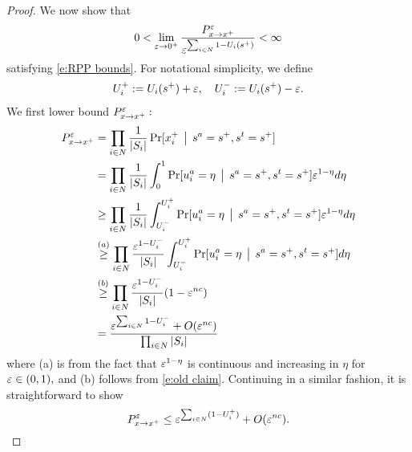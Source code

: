 \begin{proof}
We now show that
\begin{equation}
0 < \lim_{\varepsilon\to 0^+} \frac{P^\varepsilon_{x\to x^+}}{\varepsilon^{\sum_{i\in N}1 - U_i(s^+)}}<\infty
\end{equation}
satisfying \eqref{e:RPP bounds}. For notational simplicity, we define 
\begin{align}
U_i^+	:= U_i(s^+)+\varepsilon,\quad U_i^-	:=U_i(s^+) - \varepsilon.\label{e:u defns}
\end{align}
We first lower bound $P^\varepsilon_{x\to x^+} :$
\small
{\allowdisplaybreaks[3]\begin{align}
P^\eps_{x\to x^+}	&= \prod_{i\in N}{1\over|S_i|}\Pr[x_i^+ \given s^a = s^+, s^t =s^+]\nonumber\\
			&= \prod_{i\in N}{1\over |S_i|}\int_0^1 \Pr[u_i^a = \eta \given s^a = s^+, s^t = s^+]\eps^{1-\eta}d\eta\nonumber\\
			&\geq \prod_{i\in N}{1\over |S_i|}\int_{U_i^-}^{U_i^+}\Pr[u_i^a = \eta\given s^a = s^+, s^t = s^+ ]\eps^{1-\eta}d\eta\nonumber\\
			&\stackrel{(a)}{\geq}\prod_{i\in N}{\eps^{1 - U_i^-}\over |S_i|}\int_{U_i^-}^{U_i^+} \Pr[u_i^a = \eta\given  s^a = s^+, s^t = s^+] d\eta\nonumber\\
			&\stackrel{(b)}{\geq}\prod_{i\in N}{\eps^{1 - U_i^-}\over |S_i|}(1-\eps^{nc})\nonumber\\
			&={\eps^{\sum_{i\in N} 1 - U_i^-} + O(\eps^{nc})\over\prod_{i\in N} |S_i|}\label{e:lb}%
\end{align}}
\normalsize
where
(a) is from the fact that $\varepsilon^{1-\eta}$ is continuous and increasing in $\eta$ for $\varepsilon\in(0,1),$ and 
(b) follows from \eqref{e:old claim}.  
Continuing in a similar fashion, it is straightforward to show 
\begin{equation}\label{e:ub}
P^\varepsilon_{x\to x^+}\leq\varepsilon^{\sum_{i\in N}(1-U_i^+)} + O(\varepsilon^{nc}).
\end{equation}


\end{proof}
